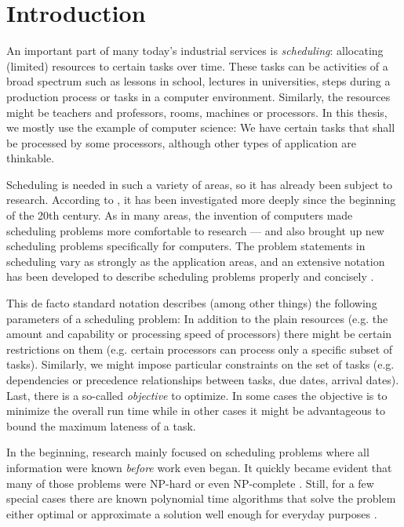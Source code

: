 \chapter{Introduction}
\label{chap:introduction}

An important part of many today's industrial services is \emph{scheduling}: allocating (limited) resources to certain tasks over time. These tasks can be activities of a broad spectrum such as lessons in school, lectures in universities, steps during a production process or tasks in a computer environment. Similarly, the resources might be teachers and professors, rooms, machines or processors. In this thesis, we mostly use the example of computer science: We have certain tasks that shall be processed by some processors, although other types of application are thinkable.

Scheduling is needed in such a variety of areas, so it has already been subject to research. According to \cite{pinedo2008scheduling}, it has been investigated more deeply since the beginning of the 20th century. As in many areas, the invention of computers made scheduling problems more comfortable to research --- and also brought up new scheduling problems specifically for computers. The problem statements in scheduling vary as strongly as the application areas, and an extensive notation has been developed to describe scheduling problems properly and concisely \cite{schedulingclassification,pinedo2008scheduling}.

This de facto standard notation describes (among other things) the following parameters of a scheduling problem: In addition to the plain resources (e.g. the amount and capability or processing speed of processors) there might be certain restrictions on them (e.g. certain processors can process only a specific subset of tasks). Similarly, we might impose particular constraints on the set of tasks (e.g. dependencies or precedence relationships between tasks, due dates, arrival dates). Last, there is a so-called \emph{objective} to optimize. In some cases the objective is to minimize the overall run time while in other cases it might be advantageous to bound the maximum lateness of a task.

In the beginning, research mainly focused on scheduling problems where all information were known \emph{before} work even began. It quickly became evident that many of those problems were NP-hard or even NP-complete
\cite{Ullman:1975:NSP:1739944.1740138,
  computers-intractability,
  short-shop-schedules-np,
  flowshop-jobshop-garey-np}
.
Still, for a few special cases there are known polynomial time algorithms that solve the problem either optimal or approximate a solution well enough for everyday purposes \cite{pinedo2008scheduling}.

